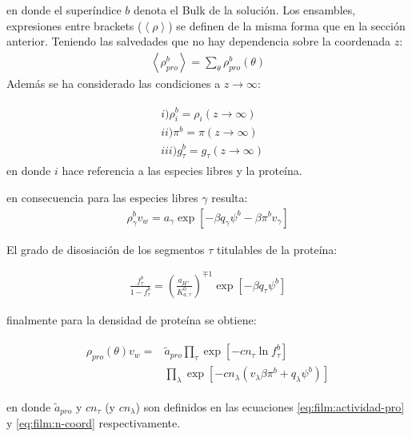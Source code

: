 \noindent en donde el super\'indice $b$ denota el Bulk de la soluci\'on. 
 Los ensambles, expresiones entre brackets ($\left<\rho\right>$) se definen de la misma forma que en la secci\'on anterior. Teniendo las salvedades que no hay dependencia sobre la coordenada $z$:
 \begin{align}
 	\left<\rho^b_{pro}\right> = \sum_{\theta}\rho^b_{pro}(\theta)
 \end{align}
 Adem\'as se ha considerado las condiciones a $z \to \infty$:

\begin{align}
	\begin{aligned}
		& i)\rho^b_i =\rho_i (z \rightarrow \infty)   \\
		& ii)  \pi^b = \pi(z \rightarrow \infty) \\
		& iii) g_\tau^b = g_\tau(z \rightarrow \infty)  
	\end{aligned}
\end{align}
\noindent en donde $i$ hace referencia a las especies libres y la prote\'ina. 

en consecuencia para las especies libres $\gamma$ resulta:
\begin{align}
	\rho^b_\gamma v_w = a_\gamma \exp\left[ -\beta q_\gamma \psi^b -\beta \pi^b v_\gamma \right]
	\label{eq:film:rhofree-bulk}
\end{align}

El grado de disosiaci\'on de los segmentos $\tau$ titulables de la prote\'ina:

\begin{align}
		\frac{f^b_\tau}{1-f^b_\tau} = \left(\frac{a_{H^+}}{K^0_{a,\tau}}\right)^{\mp 1} \exp[-\beta q_\tau \psi^b]
\end{align}


finalmente para la densidad de prote\'ina se obtiene:

\begin{align}
	\begin{aligned}
		\rho_{pro}(\theta)v_w = &\tilde{a}_{pro} \prod_\tau \exp\left[-cn_\tau \ln f^b_\tau\right] \\
		& \prod_\lambda \exp \left[-cn_\lambda (v_\lambda\beta\pi^b + q_\lambda \psi^b) \right]
	\end{aligned}
	\label{eq:film:rhopro-bulk}
\end{align}

\noindent en donde $\tilde{a}_{pro}$ y $cn_\tau$ (y $cn_\lambda$) son definidos en las ecuaciones  \ref{eq:film:actividad-pro} y \ref{eq:film:n-coord} respectivamente. 


